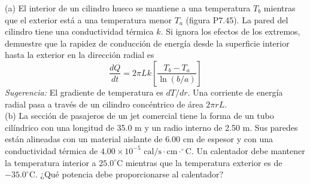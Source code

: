 \item (a) El interior de un cilindro hueco se mantiene a una temperatura $T_b$ mientras que el exterior está a una temperatura menor $T_a$ (figura P7.45). La pared del cilindro tiene una conductividad térmica $k$. Si ignora los efectos de los extremos, demuestre que la rapidez de conducción de energía desde la superficie interior hasta la exterior en la dirección radial es
$$ \frac{dQ}{dt} = 2\pi Lk \left[ \frac{T_b - T_a}{\ln(b/a)} \right] $$
\textit{Sugerencia:} El gradiente de temperatura es $dT/dr$. Una corriente de energía radial pasa a través de un cilindro concéntrico de área $2\pi rL$. \\
(b) La sección de pasajeros de un jet comercial tiene la forma de un tubo cilíndrico con una longitud de 35.0 m y un radio interno de 2.50 m. Sus paredes están alineadas con un material aislante de 6.00 cm de espesor y con una conductividad térmica de $4.00 \times 10^{-5}\text{ cal/s}\cdot\text{cm}\cdot^\circ\text{C}$. Un calentador debe mantener la temperatura interior a $25.0^\circ\text{C}$ mientras que la temperatura exterior es de $-35.0^\circ\text{C}$. ¿Qué potencia debe proporcionarse al calentador?
